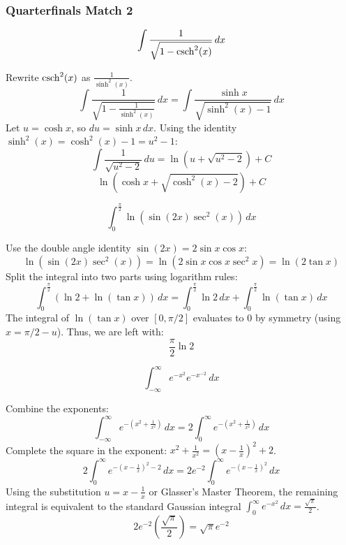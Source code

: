 \subsubsection*{Quarterfinals Match 2}
\begin{questions}
    \question
    \[ \int \frac{1}{\sqrt{1 - \operatorname{csch}^2(x)}} \, dx \]
    \begin{solution}
        Rewrite $\operatorname{csch}^2(x)$ as $\frac{1}{\sinh^2(x)}$. 
        \[ \int \frac{1}{\sqrt{1 - \frac{1}{\sinh^2(x)}}} \, dx = \int \frac{\sinh x}{\sqrt{\sinh^2(x) - 1}} \, dx \]
        Let $u = \cosh x$, so $du = \sinh x \, dx$. Using the identity $\sinh^2(x) = \cosh^2(x) - 1 = u^2 - 1$:
        \[ \int \frac{1}{\sqrt{u^2 - 2}} \, du = \ln\left(u + \sqrt{u^2 - 2}\right) + C \]
        \[ \ln\left(\cosh x + \sqrt{\cosh^2(x) - 2}\right) + C \]
    \end{solution}

    \question
    \[ \int_{0}^{\frac{\pi}{2}} \ln(\sin(2x) \sec^2(x)) \, dx \]
    \begin{solution}
        Use the double angle identity $\sin(2x) = 2 \sin x \cos x$:
        \[ \ln(\sin(2x) \sec^2(x)) = \ln(2 \sin x \cos x \sec^2 x) = \ln(2 \tan x) \]
        Split the integral into two parts using logarithm rules:
        \[ \int_{0}^{\frac{\pi}{2}} (\ln 2 + \ln(\tan x)) \, dx = \int_{0}^{\frac{\pi}{2}} \ln 2 \, dx + \int_{0}^{\frac{\pi}{2}} \ln(\tan x) \, dx \]
        The integral of $\ln(\tan x)$ over $[0, \pi/2]$ evaluates to $0$ by symmetry (using $x = \pi/2 - u$). Thus, we are left with:
        \[ \frac{\pi}{2} \ln 2 \]
    \end{solution}

    \question
    \[ \int_{-\infty}^{\infty} e^{-x^2} e^{-x^{-2}} \, dx \]
    \begin{solution}
        Combine the exponents:
        \[ \int_{-\infty}^{\infty} e^{-\left(x^2 + \frac{1}{x^2}\right)} \, dx = 2 \int_{0}^{\infty} e^{-\left(x^2 + \frac{1}{x^2}\right)} \, dx \]
        Complete the square in the exponent: $x^2 + \frac{1}{x^2} = \left(x - \frac{1}{x}\right)^2 + 2$.
        \[ 2 \int_{0}^{\infty} e^{-\left(x - \frac{1}{x}\right)^2 - 2} \, dx = 2e^{-2} \int_{0}^{\infty} e^{-\left(x - \frac{1}{x}\right)^2} \, dx \]
        Using the substitution $u = x - \frac{1}{x}$ or Glasser's Master Theorem, the remaining integral is equivalent to the standard Gaussian integral $\int_{0}^{\infty} e^{-x^2} \, dx = \frac{\sqrt{\pi}}{2}$.
        \[ 2e^{-2} \left( \frac{\sqrt{\pi}}{2} \right) = \sqrt{\pi} e^{-2} \]
    \end{solution}
\end{questions}


